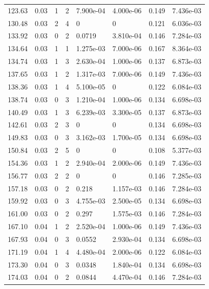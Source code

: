\documentclass[preview]{standalone}
\begin{document}
{{{\begin{tabular}{L{1.2cm}C{1.2cm} C{0.3cm}C{0.5cm} C{1.4cm}C{1.4cm} C{1.4cm}C{1.4cm}}
  123.63  &  0.03  & 1     &  2 &  7.900e-04  & 4.000e-06  & 0.149 &  7.436e-03   \\ 
  130.48  &  0.03  & 2     &  4 &  0  & 0  & 0.121 &  6.036e-03   \\ 
  133.92  &  0.03  & 0     &  2 &  0.0719  & 3.810e-04  & 0.146 &  7.284e-03   \\ 
  134.64  &  0.03  & 1     &  1 &  1.275e-03  & 7.000e-06  & 0.167 &  8.364e-03   \\ 
  134.74  &  0.03  & 1     &  3 &  2.630e-04  & 1.000e-06  & 0.137 &  6.873e-03   \\ 
  137.65  &  0.03  & 1     &  2 &  1.317e-03  & 7.000e-06  & 0.149 &  7.436e-03   \\ 
  138.36  &  0.03  & 1     &  4 &  5.100e-05  & 0  & 0.122 &  6.084e-03   \\ 
  138.74  &  0.03  & 0     &  3 &  1.210e-04  & 1.000e-06  & 0.134 &  6.698e-03   \\ 
  140.49  &  0.03  & 1     &  3 &  6.239e-03  & 3.300e-05  & 0.137 &  6.873e-03   \\ 
  142.61  &  0.03  & 2     &  3 &  0  & 0  & 0.134 &  6.698e-03   \\ 
  149.83  &  0.03  & 0     &  3 &  3.162e-03  & 1.700e-05  & 0.134 &  6.698e-03   \\ 
  150.84  &  0.03  & 2     &  5 &  0  & 0  & 0.108 &  5.377e-03   \\ 
  154.36  &  0.03  & 1     &  2 &  2.940e-04  & 2.000e-06  & 0.149 &  7.436e-03   \\ 
  156.77  &  0.03  & 2     &  2 &  0  & 0  & 0.146 &  7.285e-03   \\ 
  157.18  &  0.03  & 0     &  2 &  0.218  & 1.157e-03  & 0.146 &  7.284e-03   \\ 
  159.92  &  0.03  & 0     &  3 &  4.755e-03  & 2.500e-05  & 0.134 &  6.698e-03   \\ 
  161.00  &  0.03  & 0     &  2 &  0.297  & 1.575e-03  & 0.146 &  7.284e-03   \\ 
  167.10  &  0.04  & 1     &  2 &  2.520e-04  & 1.000e-06  & 0.149 &  7.436e-03   \\ 
  167.93  &  0.04  & 0     &  3 &  0.0552  & 2.930e-04  & 0.134 &  6.698e-03   \\ 
  171.19  &  0.04  & 1     &  4 &  4.480e-04  & 2.000e-06  & 0.122 &  6.084e-03   \\ 
  173.30  &  0.04  & 0     &  3 &  0.0348  & 1.840e-04  & 0.134 &  6.698e-03   \\ 
  174.03  &  0.04  & 0     &  2 &  0.0844  & 4.470e-04  & 0.146 &  7.284e-03   \\ 

\end{tabular}}}}
\end{document}
